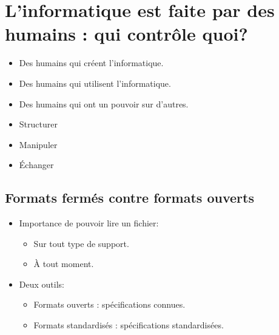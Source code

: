 \section[Qui contrôle quoi?]{L'informatique est faite par des humains : qui contrôle quoi?}


\begin{frame}
	\begin{itemize}
		\item Des humains qui créent l'informatique.
		\item Des humains qui utilisent l'informatique.
		\item Des humains qui ont un pouvoir sur d'autres.
	\end{itemize}
\end{frame}

\begin{frame}
\begin{itemize}
	
	\begin{itemize}
		\item Structurer
		\item Manipuler
		\item Échanger
	\end{itemize}
	
\end{itemize}
\end{frame}


\subsection{Formats fermés contre formats ouverts}

\begin{frame}
	\begin{itemize}
	\item Importance de pouvoir lire un fichier:
		\begin{itemize}
			\item Sur tout type de support.
			\item À tout moment.
		\end{itemize}
	\item Deux outils:
		\begin{itemize}
			\item Formats ouverts : spécifications connues.
			\item Formats standardisés : spécifications standardisées.
		\end{itemize}
	\end{itemize}
\end{frame}

